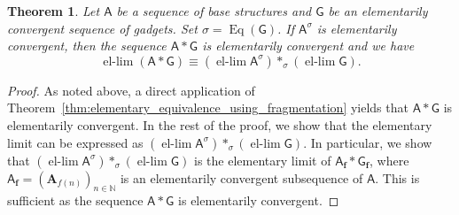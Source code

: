 \documentclass[11pt]{article}
\theoremstyle{plain}
\newtheorem{theorem}{Theorem}[section]
\theoremstyle{definition}
\theoremstyle{remark}
\DeclareMathOperator\Eq{Eq}
\newcommand{\N}{\mathbb{N}}
\newcommand{\str}[1]{\mathbf{#1}}
\newcommand{\strseq}[1]{{\boldsymbol{\mathsf{#1}}}}
\DeclareMathOperator{\ellim}{el-lim}
\begin{document}
\begin{theorem}\label{thm:preservation_of_elementary_convergence_with_fragmentation}
    Let $\strseq{A}$ be a sequence of base structures and $\strseq{G}$ be an elementarily convergent sequence of gadgets.
    Set $\sigma = \Eq(\strseq{G})$.
    If $\strseq{A}^\sigma$ is elementarily convergent, then the sequence $\strseq{A} * \strseq{G}$ is elementarily convergent and we have
    \[
        \ellim (\strseq{A}*\strseq{G}) \equiv (\ellim \strseq{A}^\sigma) *_\sigma (\ellim \strseq{G})
        .
    \]
\end{theorem}
\begin{proof}
    As noted above, a direct application of Theorem~\ref{thm:elementary_equivalence_using_fragmentation} yields that $\strseq{A}*\strseq{G}$ is elementarily convergent.
    In the rest of the proof, we show that the elementary limit can be expressed as $(\ellim \strseq{A}^\sigma) *_\sigma (\ellim \strseq{G})$.
    In particular, we show that $(\ellim \strseq{A}^\sigma) *_\sigma (\ellim \strseq{G})$ is the elementary limit of $\strseq{A}_{\bm{f}}*\strseq{G}_{\bm{f}}$, where $\strseq{A}_{\bm{f}} = (\str{A}_{f(n)})_{n \in \N}$ is an elementarily convergent subsequence of $\strseq{A}$.
    This is sufficient as the sequence $\strseq{A}*\strseq{G}$ is elementarily convergent.


\end{proof}
\end{document}
